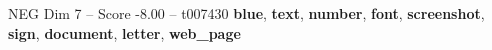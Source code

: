 \begin{textsample}{NEG Dim 7 – Score -8.00 – t007430}  \label{ex:f7_neg_006}
\textbf{blue}, \textbf{text}, \textbf{number}, \textbf{font}, \textbf{screenshot}, \textbf{sign}, \textbf{document}, \textbf{letter}, \textbf{web\_page}

\end{textsample}

